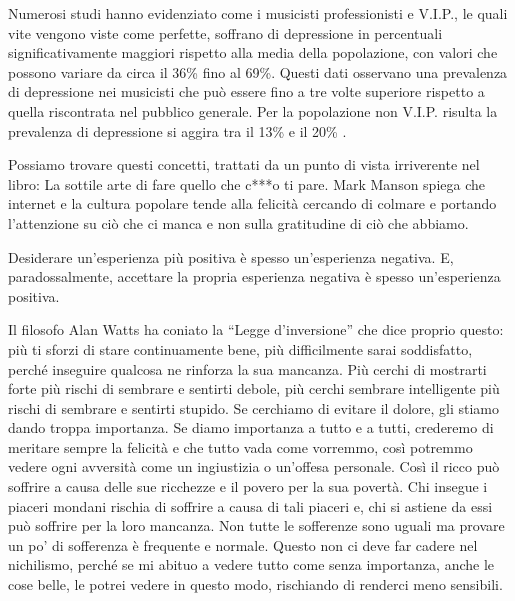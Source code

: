 \documentclass[12pt]{book} %
\begin{document}
Numerosi studi hanno evidenziato come i musicisti professionisti e V.I.P., le quali vite vengono viste come perfette, soffrano di depressione in percentuali significativamente maggiori rispetto alla media della popolazione, con valori che possono variare da circa il 36\% fino al 69\%. Questi dati osservano una prevalenza di depressione nei musicisti che può essere fino a tre volte superiore rispetto a quella riscontrata nel pubblico generale. Per la popolazione non V.I.P. risulta la prevalenza di depressione si aggira tra il 13\% e il 20\%   .

Possiamo trovare questi concetti, trattati da un punto di vista irriverente nel libro: La sottile arte di fare quello
che c***o ti pare. Mark Manson spiega che internet e la cultura popolare
tende alla felicità cercando di colmare e portando l'attenzione su ciò che ci manca e non sulla gratitudine di ciò che abbiamo.

Desiderare un'esperienza più positiva è spesso un'esperienza negativa. 
E, paradossalmente, accettare la propria esperienza negativa è spesso un'esperienza positiva.

Il filosofo Alan Watts ha coniato la “Legge d'inversione” che dice proprio questo: 
più ti sforzi di stare continuamente bene, più difficilmente sarai soddisfatto, perché inseguire qualcosa ne rinforza la sua mancanza. Più cerchi di mostrarti forte più rischi di sembrare e sentirti debole, più cerchi sembrare intelligente più rischi di sembrare e sentirti stupido. Se cerchiamo di evitare il dolore, gli stiamo dando troppa importanza. Se diamo importanza a tutto e a tutti, crederemo di
meritare sempre la felicità e che tutto vada come vorremmo, così potremmo vedere ogni avversità come un ingiustizia o
un'offesa personale. Così il ricco può soffrire a causa delle sue ricchezze e il povero per la sua
povertà. Chi insegue i piaceri mondani rischia di soffrire a causa di tali piaceri e, chi si astiene da essi può soffrire per la loro
mancanza. Non tutte le sofferenze sono uguali ma provare un po' di sofferenza è frequente e normale.
Questo non ci deve far cadere nel nichilismo, perché se mi abituo a vedere tutto come senza importanza, anche le cose belle, le potrei vedere in questo modo, rischiando di renderci meno sensibili.
\end{document}
